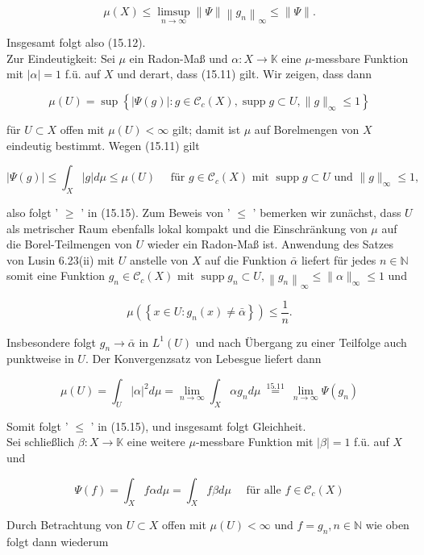 \documentclass[10pt, letterpaper]{article}
\begin{document}
$$
\mu(X) \leq \limsup _{n \rightarrow \infty}\|\Psi\|\left\|g_{n}\right\|_{\infty} \leq\|\Psi\| .
$$

Insgesamt folgt also (15.12).\\
Zur Eindeutigkeit: Sei $\mu$ ein Radon-Maß und $\alpha: X \rightarrow \mathbb{K}$ eine $\mu$-messbare Funktion mit $|\alpha|=1$ f.ü. auf $X$ und derart, dass (15.11) gilt. Wir zeigen, dass dann

$$
\mu(U)=\sup \left\{|\Psi(g)|: g \in \mathcal{C}_{c}(X), \operatorname{supp} g \subset U,\|g\|_{\infty} \leq 1\right\}
$$

für $U \subset X$ offen mit $\mu(U)<\infty$ gilt; damit ist $\mu$ auf Borelmengen von $X$ eindeutig bestimmt. Wegen (15.11) gilt

$$
|\Psi(g)| \leq \int_{X}|g| d \mu \leq \mu(U) \quad \text { für } g \in \mathcal{C}_{c}(X) \text { mit } \operatorname{supp} g \subset U \text { und }\|g\|_{\infty} \leq 1 \text {, }
$$

also folgt ' $\geq$ ' in (15.15). Zum Beweis von ' $\leq$ ' bemerken wir zunächst, dass $U$ als metrischer Raum ebenfalls lokal kompakt und die Einschränkung von $\mu$ auf die Borel-Teilmengen von $U$ wieder ein Radon-Maß ist. Anwendung des Satzes von Lusin 6.23(ii) mit $U$ anstelle von $X$ auf die Funktion $\bar{\alpha}$ liefert für jedes $n \in \mathbb{N}$ somit eine Funktion $g_{n} \in \mathcal{C}_{c}(X)$ mit $\operatorname{supp} g_{n} \subset U,\left\|g_{n}\right\|_{\infty} \leq\|\alpha\|_{\infty} \leq 1$ und

$$
\mu\left(\left\{x \in U: g_{n}(x) \neq \bar{\alpha}\right\}\right) \leq \frac{1}{n} .
$$

Insbesondere folgt $g_{n} \rightarrow \bar{\alpha}$ in $L^{1}(U)$ und nach Übergang zu einer Teilfolge auch punktweise in $U$. Der Konvergenzsatz von Lebesgue liefert dann

$$
\mu(U)=\int_{U}|\alpha|^{2} d \mu=\lim _{n \rightarrow \infty} \int_{X} \alpha g_{n} d \mu \stackrel{\text { 15.11 }}{=} \lim _{n \rightarrow \infty} \Psi\left(g_{n}\right)
$$

Somit folgt ' $\leq$ ' in (15.15), und insgesamt folgt Gleichheit.\\
Sei schließlich $\beta: X \rightarrow \mathbb{K}$ eine weitere $\mu$-messbare Funktion mit $|\beta|=1$ f.ü. auf $X$ und

$$
\Psi(f)=\int_{X} f \alpha d \mu=\int_{X} f \beta d \mu \quad \text { für alle } f \in \mathcal{C}_{c}(X)
$$

Durch Betrachtung von $U \subset X$ offen mit $\mu(U)<\infty$ und $f=g_{n}, n \in \mathbb{N}$ wie oben folgt dann wiederum
\end{document}
